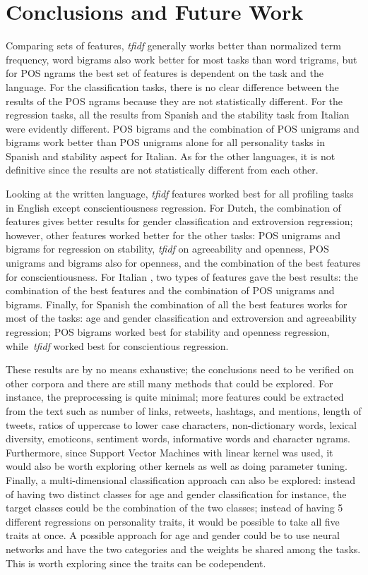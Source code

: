 \documentclass[a4paper]{llncs}
\begin{document}
\section{Conclusions and Future Work}
Comparing sets of features, \textit{tfidf} generally works better than normalized term frequency, word bigrams also work better for most tasks than word trigrams, but for POS ngrams the best set of features is dependent on the task and the language. For the classification tasks, there is no clear difference between the results of the POS ngrams because they are not statistically different. For the regression tasks, all the results from Spanish and the stability task from Italian were evidently different. POS bigrams and the combination of POS unigrams and bigrams work better than POS unigrams alone for all personality tasks in Spanish and stability aspect for Italian. As for the other languages, it is not definitive since the results are not statistically different from each other. 

Looking at the written language, \textit{tfidf} features worked best for all profiling tasks in English except conscientiousness regression. For Dutch, the combination of features gives better results for gender classification and extroversion regression; however, other features worked better for the other tasks: POS unigrams and bigrams for regression on stability, \textit{tfidf} on agreeability and openness, POS unigrams and bigrams also for openness, and the combination of the best features for conscientiousness. For Italian , two types of features gave the best results: the combination of the best features and the combination of POS unigrams and bigrams. Finally, for Spanish the combination of all the best features works for most of the tasks: age and gender classification and extroversion and agreeability regression; POS bigrams worked best for stability and openness regression, while~\textit{tfidf} worked best for conscientious regression.

These results are by no means exhaustive; the conclusions need to be verified on other corpora and there are still many methods that could be explored. For instance, the preprocessing is quite minimal; more features could be extracted from the text such as number of links, retweets, hashtags, and mentions, length of tweets, ratios of uppercase to lower case characters, non-dictionary words, lexical diversity, emoticons, sentiment words, informative words and character ngrams. Furthermore, since Support Vector Machines with linear kernel was used, it would also be worth exploring other kernels as well as doing parameter tuning. Finally, a multi-dimensional classification approach can also be explored: instead of having two distinct classes for age and gender classification for instance, the target classes could be the combination of the two classes; instead of having 5 different regressions on personality traits, it would be possible to take all five traits at once. A possible approach for age and gender could be to use neural networks and have the two categories and the weights be shared among the tasks. This is worth exploring since the traits can be codependent.
\end{document}
